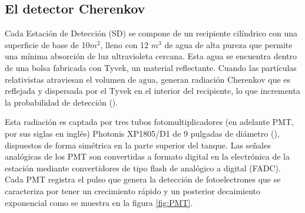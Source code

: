\subsection{El detector Cherenkov}
 
Cada Estación de Detección (SD) se compone de un recipiente cilíndrico con una superficie de base de 10$m^{2}$, lleno con 12 $m^{3}$ de agua de alta pureza que permite una mínima absorción de luz ultravioleta cercana. Esta agua se encuentra dentro de una bolsa fabricada con Tyvek, un material reflectante. Cuando las partículas relativistas atraviesan el volumen de agua, generan radiación Cherenkov que es reflejada y dispersada por el Tyvek en el interior del recipiente, lo que incrementa la probabilidad de detección (\cite{SD_auger}).

Esta radiación es captada por tres tubos fotomultiplicadores (en adelante PMT, por sus siglas en inglés) Photonis XP1805/D1 de 9 pulgadas de diámetro (\cite{Aab_2015}), dispuestos de forma simétrica en la parte superior del tanque. Las señales analógicas de los PMT son convertidas a formato digital en la electrónica de la estación mediante convertidores de tipo flash de analógico a digital (FADC). Cada PMT registra el pulso que genera la detección de fotoelectrones que se caracteriza por tener un crecimiento rápido y un posterior decaimiento exponencial como se muestra en la figura \ref{fig:PMT}.


